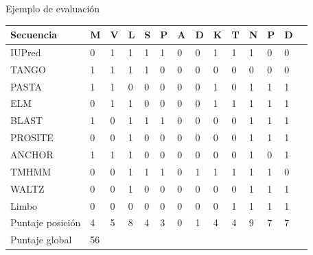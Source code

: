 \documentclass{beamer}
\begin{document}
% 
\begin{frame}{Ejemplo de evaluación}

\begin{adjustbox}{width=\textwidth}
 \begin{tabular}{llllllllllllll} 
\hline
\rowcolor{GrayOscuro}Secuencia & \textbf{M} & \textbf{V} & \textbf{L} & \textbf{S} & \textbf{P} & \textbf{A} & \textbf{D} & \textbf{K} & \textbf{T} & \textbf{N} & \textbf{P} & \textbf{D} \\ \hline \hline
 
\rowcolor{Gray}IUPred           	& 0 & 1 & 1 & 1 & 1 & 0 & 0 & 1 & 1 & 1 & 0 & 0\\ \hline  
TANGO 		       			& 1 & 1 & 1 & 1 & 0 & 0 & 0 & 0 & 0 & 0 & 0 & 0\\ \hline  
\rowcolor{Gray}PASTA			& 1 & 1 & 0 & 0 & 0 & 0 & 0 & 1 & 0 & 1 & 1 & 1\\ \hline  
ELM          	      			& 0 & 1 & 1 & 0 & 0 & 0 & 0 & 1 & 1 & 1 & 1 & 1\\ \hline 
\rowcolor{Gray}BLAST			& 1 & 0 & 1 & 1 & 1 & 0 & 0 & 0 & 0 & 1 & 1 & 1\\ \hline 
PROSITE 	      			& 0 & 0 & 1 & 0 & 0 & 0 & 0 & 0 & 0 & 1 & 1 & 1\\ \hline 
\rowcolor{Gray}ANCHOR	        	& 1 & 1 & 1 & 0 & 0 & 0 & 0 & 0 & 0 & 1 & 0 & 1\\ \hline
TMHMM 	      				& 0 & 0 & 1 & 1 & 1 & 0 & 1 & 1 & 1 & 1 & 1 & 0\\ \hline 
\rowcolor{Gray}WALTZ 	      		& 0 & 0 & 1 & 0 & 0 & 0 & 0 & 0 & 0 & 1 & 1 & 1\\ \hline 
Limbo	      				& 0 & 0 & 0 & 0 & 0 & 0 & 0 & 0 & 1 & 1 & 1 & 1\\ \hline \hline 
\rowcolor{GrayOscuro}Puntaje posición     & 4 & 5 & 8 & 4 & 3 & 0 & 1 & 4 & 4 & 9 & 7 & 7\\ \hline
\rowcolor{GrayOscuro}Puntaje global  & 56 &&&&&&&&&&& \\ \hline
\end{tabular}
\end{adjustbox}
\end{frame}
\end{document}
